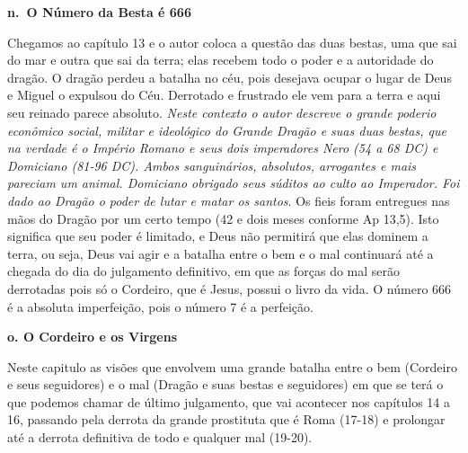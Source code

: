 \documentclass[
]{book}
\begin{document}
\textbf{n.~O Número da Besta é 666}

Chegamos ao capítulo 13 e o autor coloca a questão das duas bestas, uma que sai do mar e outra que sai da terra; elas recebem todo o poder e a autoridade do dragão. O dragão perdeu a batalha no céu, pois desejava ocupar o lugar de Deus e Miguel o expulsou do Céu. Derrotado e frustrado ele vem para a terra e aqui seu reinado parece absoluto. \emph{Neste contexto o autor descreve o grande poderio econômico social, militar e ideológico do Grande Dragão e suas duas bestas, que na verdade é o Império Romano e seus dois imperadores Nero (54 a 68 DC) e Domiciano (81-96 DC). Ambos sanguinários, absolutos, arrogantes e mais pareciam um animal. Domiciano obrigado seus súditos ao culto ao Imperador. Foi dado ao Dragão o poder de lutar e matar os santos}. Os fieis foram entregues nas mãos do Dragão por um certo tempo (42 e dois meses conforme Ap 13,5). Isto significa que seu poder é limitado, e Deus não permitirá que elas dominem a terra, ou seja, Deus vai agir e a batalha entre o bem e o mal continuará até a chegada do dia do julgamento definitivo, em que as forças do mal serão derrotadas pois só o Cordeiro, que é Jesus, possui o livro da vida. O número 666 é a absoluta imperfeição, pois o número 7 é a perfeição.

\textbf{o. O Cordeiro e os Virgens}

Neste capitulo as visões que envolvem uma grande batalha entre o bem (Cordeiro e seus seguidores) e o mal (Dragão e suas bestas e seguidores) em que se terá o que podemos chamar de último julgamento, que vai acontecer nos capítulos 14 a 16, passando pela derrota da grande prostituta que é Roma (17-18) e prolongar até a derrota definitiva de todo e qualquer mal (19-20).
\end{document}
